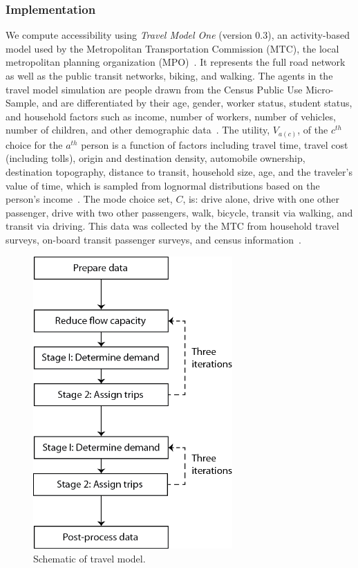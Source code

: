 \subsubsection{Implementation}
We compute accessibility using  \emph{Travel Model One} (version 0.3), an activity-based model used by the Metropolitan Transportation Commission (MTC), the local metropolitan planning organization (MPO)~\cite{erhardt_mtcs_2012}. It represents the full road network as well as the public transit networks, biking, and walking. The agents in the travel model simulation are people drawn from the Census Public Use Micro-Sample, and are differentiated by their age, gender, worker status, student status, and household factors such as income, number of workers, number of vehicles, number of children, and other demographic data~\cite{erhardt_mtcs_2012,ory_personal_2013,waddell_urbansim:_2002,u.s._bureau_of_the_census_united_2010}. The utility, $V_{a(c)}$, of the $c^{th}$ choice for the $a^{th}$ person is a function of factors including travel time, travel cost (including tolls), origin and destination density, automobile ownership, destination topography, distance to transit, household size, age, and the traveler’s value of time, which is sampled from lognormal distributions based on the person’s income~\cite{metropolitan_technical_2013}. The mode choice set, $C$, is: drive alone, drive with one other passenger, drive with two other passengers, walk, bicycle, transit via walking, and transit via driving. 
This data was collected by the MTC from household travel surveys, on-board transit passenger surveys, and census information~\cite{u.s._bureau_of_the_census_united_2010}. 

\begin{figure}[!htb]
\centering
\includegraphics[width=3in]{FIGS/CUBEflowchart.png} 
\caption{Schematic of travel model.}
\label{fig:traffic_model}
\end{figure}

